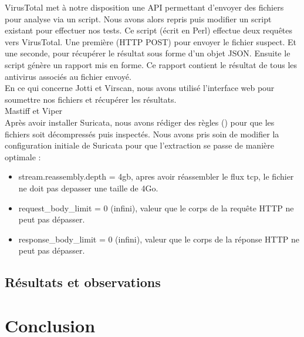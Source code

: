 \documentclass[smallextended]{svjour3}       %
\begin{document}
$ $\\
VirusTotal met à notre disposition une API permettant d'envoyer des fichiers pour analyse via un script. Nous avons alors repris puis modifier un script existant pour effectuer nos tests. Ce script (écrit en Perl) effectue deux requêtes vers VirusTotal. Une première (HTTP POST) pour envoyer le fichier suspect. Et une seconde, pour récupérer le résultat sous forme d'un objet JSON. Ensuite le script génère un rapport mis en forme. Ce rapport contient le résultat de tous les antivirus associés au fichier envoyé.\\
$ $\\
En ce qui concerne Jotti et Virscan, nous avons utilisé l'interface web pour soumettre nos fichiers et récupérer les résultats.\\
$ $\\
Mastiff et Viper\\
$ $\\
Après avoir installer Suricata, nous avons rédiger des règles (\cite{SuricataExtraction}) pour que les fichiers soit décompressés puis inspectés. 
Nous avons pris soin de modifier la configuration initiale de Suricata pour que l'extraction se passe de manière optimale :
\begin{itemize}
\item stream.reassembly.depth = 4gb, apres avoir réassembler le flux tcp, le fichier ne doit pas depasser une taille de 4Go.
\item request\_body\_limit = 0 (infini), valeur que le corps de la requête HTTP ne peut pas dépasser.
\item response\_body\_limit = 0 (infini), valeur que le corps de la réponse HTTP ne peut pas dépasser.
\end{itemize}

\subsection{Résultats et observations}
\label{3.2résultats}

\section{Conclusion}
\label{2.3ids}
\end{document}
